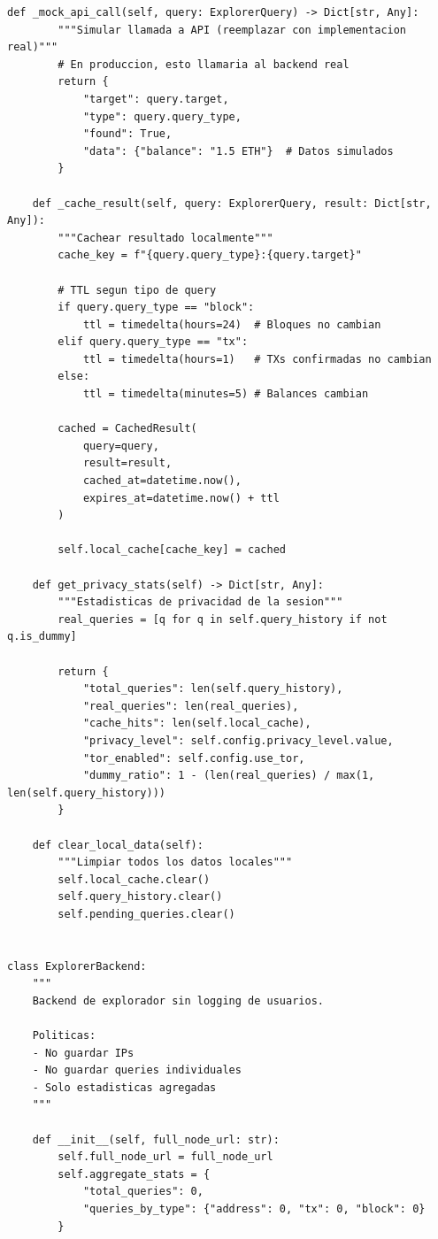 \documentclass[11pt,a4paper,twoside]{book}
\theoremstyle{definition}
\theoremstyle{remark}
\begin{document}
\begin{lstlisting}[style=python, caption={Explorador de blockchain privacy-aware}]
    def _mock_api_call(self, query: ExplorerQuery) -> Dict[str, Any]:
        """Simular llamada a API (reemplazar con implementacion real)"""
        # En produccion, esto llamaria al backend real
        return {
            "target": query.target,
            "type": query.query_type,
            "found": True,
            "data": {"balance": "1.5 ETH"}  # Datos simulados
        }
    
    def _cache_result(self, query: ExplorerQuery, result: Dict[str, Any]):
        """Cachear resultado localmente"""
        cache_key = f"{query.query_type}:{query.target}"
        
        # TTL segun tipo de query
        if query.query_type == "block":
            ttl = timedelta(hours=24)  # Bloques no cambian
        elif query.query_type == "tx":
            ttl = timedelta(hours=1)   # TXs confirmadas no cambian
        else:
            ttl = timedelta(minutes=5) # Balances cambian
        
        cached = CachedResult(
            query=query,
            result=result,
            cached_at=datetime.now(),
            expires_at=datetime.now() + ttl
        )
        
        self.local_cache[cache_key] = cached
    
    def get_privacy_stats(self) -> Dict[str, Any]:
        """Estadisticas de privacidad de la sesion"""
        real_queries = [q for q in self.query_history if not q.is_dummy]
        
        return {
            "total_queries": len(self.query_history),
            "real_queries": len(real_queries),
            "cache_hits": len(self.local_cache),
            "privacy_level": self.config.privacy_level.value,
            "tor_enabled": self.config.use_tor,
            "dummy_ratio": 1 - (len(real_queries) / max(1, len(self.query_history)))
        }
    
    def clear_local_data(self):
        """Limpiar todos los datos locales"""
        self.local_cache.clear()
        self.query_history.clear()
        self.pending_queries.clear()


class ExplorerBackend:
    """
    Backend de explorador sin logging de usuarios.
    
    Politicas:
    - No guardar IPs
    - No guardar queries individuales
    - Solo estadisticas agregadas
    """
    
    def __init__(self, full_node_url: str):
        self.full_node_url = full_node_url
        self.aggregate_stats = {
            "total_queries": 0,
            "queries_by_type": {"address": 0, "tx": 0, "block": 0}
        }
    

\end{lstlisting}
\end{document}
